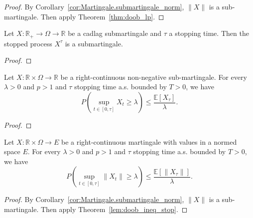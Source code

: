 \begin{proof}
  By Corollary~\ref{cor:Martingale.submartingale_norm}, $\lVert X \rVert$ is a sub-martingale.
  Then apply Theorem~\ref{thm:doob_lp}.
\end{proof}


\begin{lemma}\label{lem:Submartingale.stoppedProcess_of_cadlag}
  Let $X:\mathbb{R}_+ \to \Omega \to \mathbb{R}$ be a cadlag submartingale and $\tau$ a stopping time.
  Then the stopped process $X^\tau$ is a submartingale.
\end{lemma}

\begin{proof}

\end{proof}

\begin{lemma}\label{lem:doob_ineq_stop}
  Let $X:\mathbb{R}\times\Omega\rightarrow \mathbb{R}$ be a right-continuous non-negative sub-martingale.
  For every $\lambda>0$ and $p>1$ and $\tau$ stopping time a.s. bounded by $T>0$, we have
  $$
  P\left( \sup_{t\in[0,\tau]}X_t\geq\lambda \right)\leq \frac{\mathbb{E}[X_\tau]}{\lambda}.
  $$
\end{lemma}
\begin{proof}

\end{proof}

\begin{corollary}\label{cor:doob_ineq_stop}
  Let $X:\mathbb{R}\times\Omega\rightarrow E$ be a right-continuous martingale with values in a normed space $E$.
  For every $\lambda>0$ and $p>1$ and $\tau$ stopping time a.s. bounded by $T>0$, we have
  $$
  P\left( \sup_{t\in[0,\tau]}\lVert X_t \rVert \geq\lambda \right)\leq \frac{\mathbb{E}[\lVert X_\tau \rVert]}{\lambda}.
  $$
\end{corollary}
\begin{proof}
  By Corollary~\ref{cor:Martingale.submartingale_norm}, $\lVert X \rVert$ is a sub-martingale.
  Then apply Theorem~\ref{lem:doob_ineq_stop}.
\end{proof}

